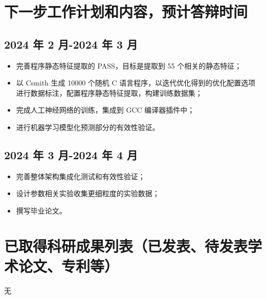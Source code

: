 \section{下一步工作计划和内容，预计答辩时间}
\subsection*{2024 年 2 月-2024 年 3 月}
\begin{itemize}[left=0pt]
    \item 完善程序静态特征提取的 PASS，目标是提取到 55 个相关的静态特征；
    \item 以 Csmith 生成 10000 个随机 C 语言程序，以迭代优化得到的优化配置选项进行数据标注，配置程序静态特征提取，构建训练数据集；
    \item 完成人工神经网络的训练，集成到 GCC 编译器插件中；
    \item 进行机器学习模型化预测部分的有效性验证。
\end{itemize}

\subsection*{2024 年 3 月-2024 年 4 月}
\begin{itemize}[left=0pt]
    \item 完善整体架构集成化测试和有效性验证；
    \item 设计参数相关实验收集更细粒度的实验数据；
    \item 撰写毕业论文。
\end{itemize}

\section{已取得科研成果列表（已发表、待发表学术论文、专利等）}
无
\nocite{*}%
